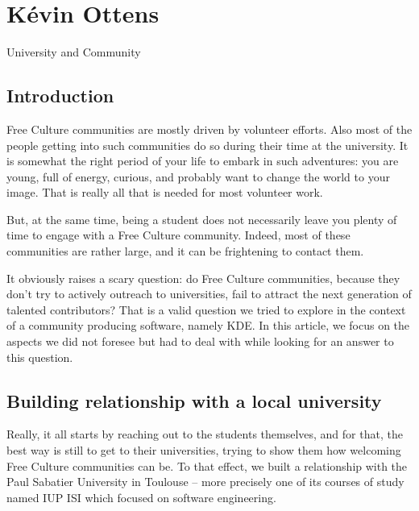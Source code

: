 
\chapter{Kévin Ottens}{University and Community}

\section*{Introduction}
Free Culture communities are mostly driven by volunteer efforts. Also most of
the people getting into such communities do so during their time at the
university. It is somewhat the right period of your life to embark in such
adventures: you are young, full of energy, curious, and probably want to change
the world to your image. That is really all that is needed for most volunteer
work.

But, at the same time, being a student does not necessarily leave you plenty of
time to engage with a Free Culture community. Indeed, most of these communities
are rather large, and it can be frightening to contact them.

It obviously raises a scary question: do Free Culture communities, because they
don't try to actively outreach to universities, fail to attract the next generation
of talented contributors?
That is a valid question we tried to explore in the context of a community
producing software, namely KDE. In this article, we focus on the aspects we did
not foresee but had to deal with while looking for an answer to this question.

\section*{Building relationship with a local university}
Really, it all starts by reaching out to the students themselves, and for that,
the best way is still to get to their universities, trying to show them how
welcoming Free Culture communities can be. To that effect, we built a
relationship with the Paul Sabatier University in Toulouse -- more precisely one
of its courses of study named IUP ISI which focused on software engineering.

